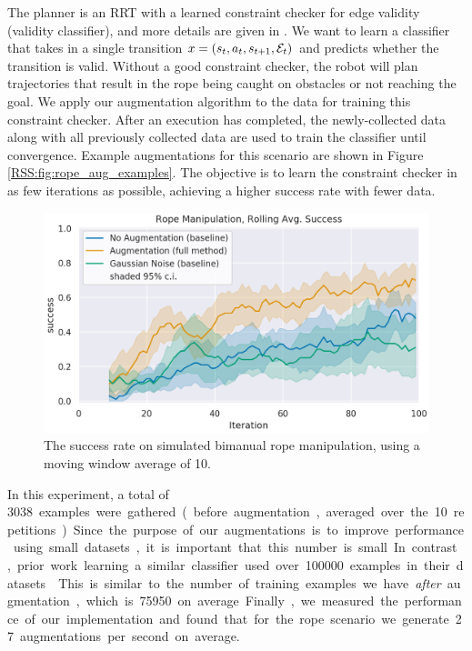 The planner is an RRT with a learned constraint checker for edge validity (validity classifier), and more details are given in \cite{UnreliableMitrano2021}. We want to learn a classifier that takes in a single transition $x = (s_t,a_t,s_{t+1},\mathcal{E}_t)$ and predicts whether the transition is valid. Without a good constraint checker, the robot will plan trajectories that result in the rope being caught on obstacles or not reaching the goal. We apply our augmentation algorithm to the data for training this constraint checker. After an execution has completed, the newly-collected data along with all previously collected data are used to train the classifier until convergence. Example augmentations for this scenario are shown in Figure \ref{RSS:fig:rope_aug_examples}. The objective is to learn the constraint checker in as few iterations as possible, achieving a higher success rate with fewer data.

\begin{figure}
    \centering
    \includegraphics[width=1\linewidth]{Chap3/images/success_rate_rolling.png}
    \caption{The success rate on simulated bimanual rope manipulation, using a moving window average of 10.}
    \label{RSS:fig:rope_results}
\end{figure}

In this experiment, a total of \SI{3038} examples were gathered (before augmentation, averaged over the 10 repetitions). Since the purpose of our augmentations is to improve performance using small datasets, it is important that this number is small. In contrast, prior work learning a similar classifier used over \SI{100000} examples in their datasets \cite{UnreliableMitrano2021,UnreliableDale2019}. This is similar to the number of training examples we have \textit{after} augmentation, which is \SI{75950} on average.  Finally, we measured the performance of our implementation and found that for the rope scenario we generate 27 augmentations per second on average.

